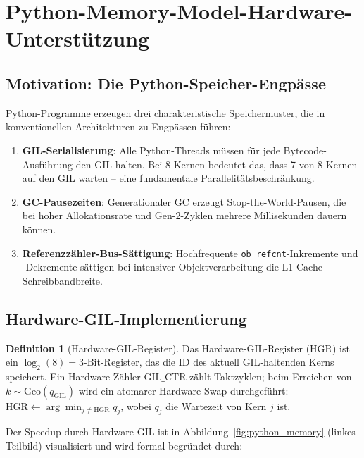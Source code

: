﻿\documentclass[a4paper,12pt]{scrreprt}
\theoremstyle{definition}
\newtheorem{definition}{Definition}[section]
\newcommand{\Geo}{\mathrm{Geo}}
\begin{document}
	\section{Python-Memory-Model-Hardware-Unterstützung}
	\label{sec:pma}
	
	\subsection{Motivation: Die Python-Speicher-Engpässe}
	
	Python-Programme erzeugen drei charakteristische Speichermuster, die
	in konventionellen Architekturen zu Engpässen führen:
	
	\begin{enumerate}[noitemsep]
		\item \textbf{GIL-Serialisierung}: Alle Python-Threads müssen für jede
		Bytecode-Ausführung den GIL halten. Bei 8 Kernen bedeutet das,
		dass 7 von 8 Kernen auf den GIL warten -- eine fundamentale
		Parallelitätsbeschränkung.
		\item \textbf{GC-Pausezeiten}: Generationaler GC erzeugt Stop-the-World-Pausen,
		die bei hoher Allokationsrate und Gen-2-Zyklen mehrere Millisekunden
		dauern können.
		\item \textbf{Referenzzähler-Bus-Sättigung}: Hochfrequente
		\texttt{ob\_refcnt}-Inkremente und -Dekremente sättigen bei
		intensiver Objektverarbeitung die L1-Cache-Schreibbandbrei\-te.
	\end{enumerate}
	
	\subsection{Hardware-GIL-Implementierung}
	
	\begin{definition}[Hardware-GIL-Register]
		\label{def:hw_gil}
		Das Hardware-GIL-Register (HGR) ist ein $\log_2(8) = 3$-Bit-Register,
		das die ID des aktuell GIL-haltenden Kerns speichert. Ein Hardware-Zähler
		$\mathrm{GIL\_CTR}$ zählt Taktzyklen; beim Erreichen von
		$k \sim \Geo(q_{\mathrm{GIL}})$ wird ein atomarer Hardware-Swap
		durchgeführt: $\mathrm{HGR} \leftarrow \arg\min_{j \ne \mathrm{HGR}} q_j$,
		wobei $q_j$ die Wartezeit von Kern $j$ ist.
	\end{definition}
	
	Der Speedup durch Hardware-GIL ist in Abbildung~\ref{fig:python_memory}
	(linkes Teilbild) visualisiert und wird formal begründet durch:
	
\end{document}
